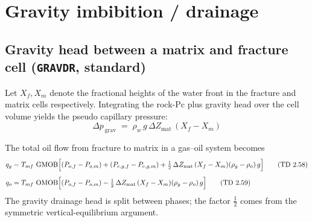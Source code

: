 \documentclass[11pt,a4paper]{article}
\newcommand{\kw}[1]{\texttt{#1}}
\DeclareMathOperator{\GMOB}{GMOB}
\DeclareMathOperator{\OMOB}{OMOB}
\begin{document}
\section{Gravity imbibition / drainage}\label{sec:gravity}

\subsection*{Gravity head between a matrix and fracture cell (\kw{GRAVDR}, standard)}
Let $X_f, X_m$ denote the fractional heights of the water front in the fracture and matrix cells respectively.
Integrating the rock-Pc plus gravity head over the cell volume yields the pseudo capillary pressure:
\begin{equation}
\Delta p_{\,\text{grav}} \;=\; \rho_w \, g \, \Delta Z_{\text{mat}}\,(X_f - X_m)
\label{eq:dpgrav}
\tag{TD 2.57}
\end{equation}

The total oil flow from fracture to matrix in a gas--oil system becomes
\begin{align}
q_{g} &= T_{mf}\,\GMOB\Bigl[(P_{o,f} - P_{o,m}) + (P_{c,g,f} - P_{c,g,m})
        + \tfrac{1}{2}\,\Delta Z_{\text{mat}}\,(X_f-X_m)(\rho_g - \rho_o)\,g\Bigr]
\label{eq:qg}
\tag{TD 2.58}\\[4pt]
q_{o} &= T_{mf}\,\OMOB\Bigl[(P_{o,f} - P_{o,m})
        - \tfrac{1}{2}\,\Delta Z_{\text{mat}}\,(X_f-X_m)(\rho_g - \rho_o)\,g\Bigr]
\label{eq:qo}
\tag{TD 2.59}
\end{align}
The gravity drainage head is split between phases; the factor $\tfrac{1}{2}$ comes from the symmetric vertical-equilibrium argument.

\end{document}
